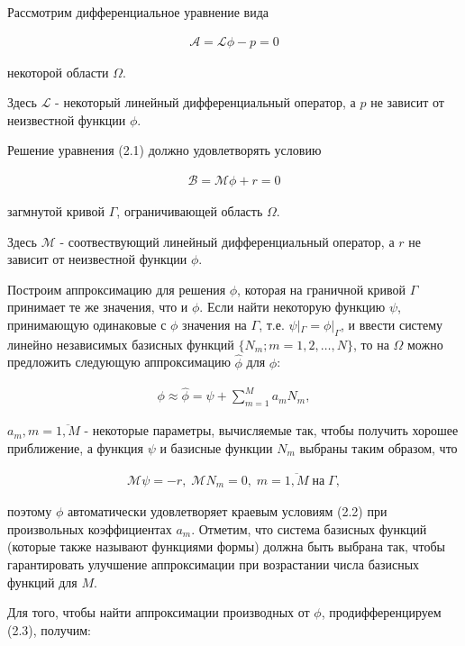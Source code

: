\documentclass[14pt]{extreport}
\begin{document}
Рассмотрим дифференциальное уравнение вида

\begin{eqnarray}
 \mathcal A= \mathcal L\phi-p=0
\end{eqnarray}

 некоторой области $\Omega$.

Здесь $\mathcal L$ - некоторый линейный дифференциальный оператор, а $p$ не зависит от неизвестной функции $\phi$.

Решение уравнения (2.1) должно удовлетворять условию

\begin{eqnarray}
\mathcal B = \mathcal M \phi+r=0
\end{eqnarray}

 загмнутой кривой $\Gamma$, ограничивающей область $\Omega$.

Здесь $\mathcal M$ - соотвествующий линейный дифференциальный оператор, а $r$ не зависит от неизвестной функции $\phi$.

Построим аппроксимацию для решения $\phi$, которая на граничной кривой $\Gamma$ принимает те же значения, что и $\phi$. Если найти некоторую функцию $\psi$, принимающую одинаковые с $\phi$ значения на $\Gamma$, т.е. $\psi|_\Gamma= \phi|_\Gamma$, и ввести систему линейно независимых базисных функций $\{N_m; m = 1,2, \dots, N\}$, то на $\Omega$ можно предложить следующую аппроксимацию $\hat{\phi}$ для $\phi$: 

\begin{eqnarray}
\phi \approx \hat\phi = \psi + \sum\limits_{m=1}^{M} a_mN_m,
\end{eqnarray}

 $a_m, m= \overline{1,M}$ - некоторые параметры, вычисляемые так, чтобы получить хорошее приближение, а функция $\psi$ и базисные функции $N_m$ выбраны таким образом, что

\begin{eqnarray}
 \mathcal M\psi=-r, \; \mathcal M N_m=0, \; m=\overline{1,M} \; \text{на} \; \Gamma,
\end{eqnarray}

 поэтому $\phi$ автоматически удовлетворяет краевым условиям (2.2) при произвольных коэффициентах $a_m$. Отметим, что система базисных функций (которые также называют функциями формы) должна быть выбрана так, чтобы гарантировать улучшение аппроксимации при возрастании числа базисных функций для $M$.

Для того, чтобы найти аппроксимации производных от $\phi$, продифференцируем (2.3), получим:
\end{document}
